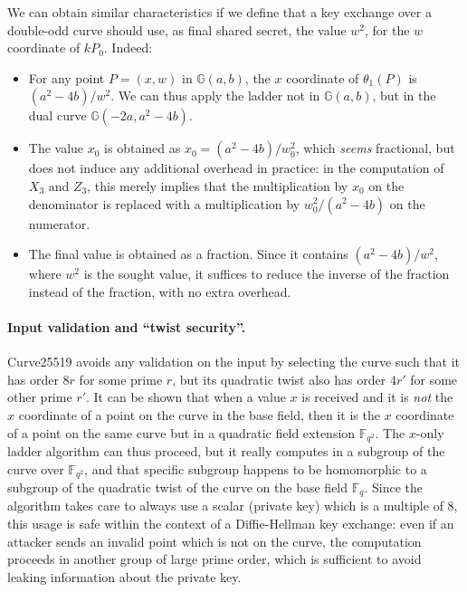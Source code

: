 \documentclass{llncs}
\newcommand{\bF}{\mathbb{F}}
\newcommand{\bG}{\mathbb{G}}
\begin{document}
We can obtain similar characteristics if we define that a key exchange
over a double-odd curve should use, as final shared secret, the value
$w^2$, for the $w$ coordinate of $kP_0$. Indeed:
\begin{itemize}

    \item For any point $P = (x, w)$ in $\bG(a, b)$, the $x$ coordinate
    of $\theta_1(P)$ is $(a^2-4b)/w^2$. We can thus apply the ladder
    not in $\bG(a, b)$, but in the dual curve $\bG(-2a, a^2-4b)$.

    \item The value $x_0$ is obtained as $x_0 = (a^2-4b)/w_0^2$, which
    \emph{seems} fractional, but does not induce any additional overhead
    in practice: in the computation of $X_3$ and $Z_3$, this merely
    implies that the multiplication by $x_0$ on the denominator is replaced
    with a multiplication by $w_0^2/(a^2-4b)$ on the numerator.

    \item The final value is obtained as a fraction. Since it contains
    $(a^2-4b)/w^2$, where $w^2$ is the sought value, it suffices to
    reduce the inverse of the fraction instead of the fraction, with
    no extra overhead.

\end{itemize}

\paragraph{Input validation and ``twist security''.}
Curve25519\cite{Ber2006} avoids any validation on the input by selecting
the curve such that it has order $8r$ for some prime $r$, but its
quadratic twist also has order $4r'$ for some other prime $r'$. It can
be shown that when a value $x$ is received and it is \emph{not} the $x$
coordinate of a point on the curve in the base field, then it is the $x$
coordinate of a point on the same curve but in a quadratic field
extension $\bF_{q^2}$. The $x$-only ladder algorithm can thus proceed,
but it really computes in a subgroup of the curve over $\bF_{q^2}$, and
that specific subgroup happens to be homomorphic to a subgroup of the
quadratic twist of the curve on the base field $\bF_q$. Since the
algorithm takes care to always use a scalar (private key) which is a
multiple of 8, this usage is safe within the context of a Diffie-Hellman
key exchange: even if an attacker sends an invalid point which is not on
the curve, the computation proceeds in another group of large prime
order, which is sufficient to avoid leaking information about the
private key.
\end{document}
